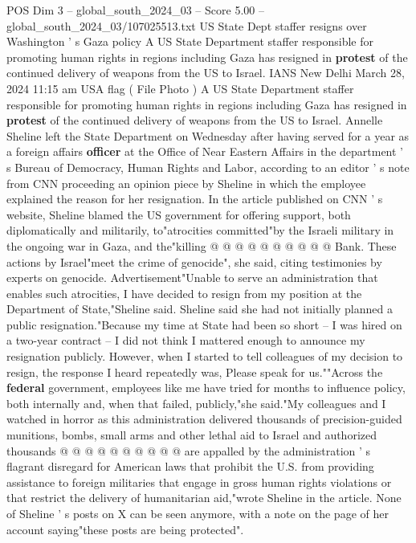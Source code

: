 \begin{textsample}{POS Dim 3 – global\_south\_2024\_03 – Score 5.00 – global\_south\_2024\_03/107025513.txt}  \label{ex:f3_pos_428}
US State Dept staffer resigns over Washington ' s Gaza policy A US State Department staffer responsible for promoting human rights in regions including Gaza has resigned in \textbf{protest} of the continued delivery of weapons from the US to Israel.
IANS New Delhi March 28, 2024 11:15 am USA flag ( File Photo ) A US State Department staffer responsible for promoting human rights in regions including Gaza has resigned in \textbf{protest} of the continued delivery of weapons from the US to Israel.
Annelle Sheline left the State Department on Wednesday after having served for a year as a foreign affairs \textbf{officer} at the Office of Near Eastern Affairs in the department ' s Bureau of Democracy, Human Rights and Labor, according to an editor ' s note from CNN proceeding an opinion piece by Sheline in which the employee explained the reason for her resignation.
In the article published on CNN ' s website, Sheline blamed the US government for offering support, both diplomatically and militarily, to"atrocities committed"by the Israeli military in the ongoing war in Gaza, and the"killing @ @ @ @ @ @ @ @ @ @ Bank.
These actions by Israel"meet the crime of genocide", she said, citing testimonies by experts on genocide.
Advertisement"Unable to serve an administration that enables such atrocities, I have decided to resign from my position at the Department of State,"Sheline said.
Sheline said she had not initially planned a public resignation."Because my time at State had been so short -- I was hired on a two-year contract -- I did not think I mattered enough to announce my resignation publicly.
However, when I started to tell colleagues of my decision to resign, the response I heard repeatedly was, Please speak for us.""Across the \textbf{federal} government, employees like me have tried for months to influence policy, both internally and, when that failed, publicly,"she said."My colleagues and I watched in horror as this administration delivered thousands of precision-guided munitions, bombs, small arms and other lethal aid to Israel and authorized thousands @ @ @ @ @ @ @ @ @ @ are appalled by the administration ' s flagrant disregard for American laws that prohibit the U.S. from providing assistance to foreign militaries that engage in gross human rights violations or that restrict the delivery of humanitarian aid,"wrote Sheline in the article.
None of Sheline ' s posts on X can be seen anymore, with a note on the page of her account saying"these posts are being protected".

\end{textsample}
